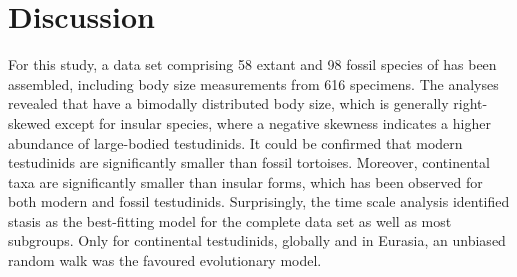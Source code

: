 \section{Discussion}

For this study, a data set comprising 58 extant and 98 fossil species of \T has been assembled, including body size measurements from 616 specimens.
The analyses revealed that \T have a bimodally distributed body size, which is generally right-skewed except for insular species, where a negative skewness indicates a higher abundance of large-bodied testudinids.
It could be confirmed that modern testudinids are significantly smaller than fossil tortoises. Moreover, continental taxa are significantly smaller than insular forms, which has been observed for both modern and fossil testudinids.
Surprisingly, the time scale analysis identified stasis as the best-fitting model for the complete data set as well as most subgroups. Only for continental testudinids, globally and in Eurasia, an unbiased random walk was the favoured evolutionary model.





